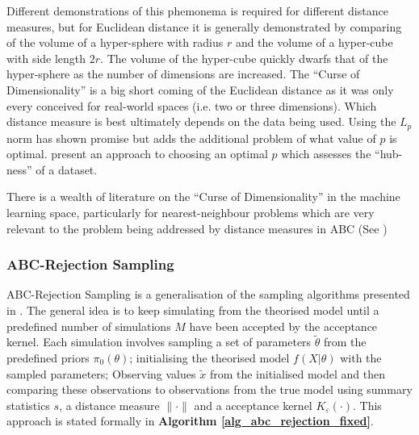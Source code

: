 \documentclass[11pt,a4paper]{article}
\theoremstyle{break}
\begin{document}
  \par Different demonstrations of this phemonema is required for different distance measures, but for Euclidean distance it is generally demonstrated by comparing of the volume of a hyper-sphere with radius $r$ and the volume of a hyper-cube with side length $2r$. The volume of the hyper-cube quickly dwarfs that of the hyper-sphere as the number of dimensions are increased. %
  The ``Curse of Dimensionality'' is a big short coming of the Euclidean distance as it was only every conceived for real-world spaces (i.e. two or three dimensions). Which distance measure is best ultimately depends on the data being used. Using the $L_p$ norm has shown promise but adds the additional problem of what value of $p$ is optimal. \cite[]{choosing_the_metric_in_high_dimensional_spaces_based_on_hub_analysis} present an approach to choosing an optimal $p$ which assesses the ``hub-ness'' of a dataset.

  \par There is a wealth of literature on the ``Curse of Dimensionality'' in the machine learning space, particularly for nearest-neighbour problems which are very relevant to the problem being addressed by distance measures in ABC (See \cite[]{when_is_nearest_neighbour_meaningful,what_is_the_nearest_neigbour_in_high_dimensional_space,hubs_in_space})

\subsubsection{ABC-Rejection Sampling}\label{sec_abc_rejection_sampling}


  ABC-Rejection Sampling is a generalisation of the sampling algorithms presented in \cite[]{inferring_coalescence_times_from_dna_sequence_data,population_growth_of_human_Y_chromosomes}. The general idea is to keep simulating from the theorised model until a predefined number of simulations $M$ have been accepted by the acceptance kernel. Each simulation involves sampling a set of parameters $\tilde\theta$ from the predefined priors $\pi_0(\theta)$; initialising the theorised model $f(X|\theta)$ with the sampled parameters; Observing values $\tilde{x}$ from the initialised model and then comparing these observations to observations from the true model using summary statistics $s$, a distance measure $\|\cdot\|$ and a acceptance kernel $K_\varepsilon(\cdot)$. This approach is stated formally in \textbf{Algorithm \ref{alg_abc_rejection_fixed}}.
\end{document}
